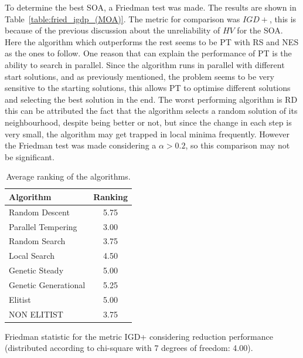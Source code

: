To determine the best SOA, a Friedman test was made. The results are shown in Table~\ref{table:fried_igdp_(MOA)}. The metric for comparison was $IGD+$, this is because of the previous discussion about the unreliability of $HV$ for the SOA. Here the algorithm which outperforms the rest seems to be PT with RS and NES as the ones to follow. One reason that can explain the performance of PT is the ability to search in parallel. Since the algorithm runs in parallel with different start solutions, and as previously mentioned, the problem seems to be very sensitive to the starting solutions, this allows PT to optimise different solutions and selecting the best solution in the end. The worst performing algorithm is RD this can be attributed the fact that the algorithm selects a random solution of its neighbourhood, despite being better or not, but since the change in each step is very small, the algorithm may get trapped in local minima frequently. However the Friedman test was made considering a $\alpha > 0.2$, so this comparison may not be significant.



\begin{table}[!htp]
    \centering
    \begin{threeparttable}
    \begin{tabular}{lc}
    \hline
    Algorithm&Ranking\\
    \hline
    Random Descent&5.75\\
    Parallel Tempering&3.00\\
    Random Search&3.75\\
    Local Search&4.50\\
    Genetic Steady&5.00\\
    Genetic Generational&5.25\\
    Elitist&5.00\\
    NON ELITIST&3.75\\
    \hline
    \end{tabular}
        \begin{tablenotes}
        \small
        \item Friedman statistic for the metric IGD+ considering reduction performance (distributed according to chi-square with 7 degrees of freedom: 4.00).
        \end{tablenotes}
    \end{threeparttable}
    \caption{Average ranking of the algorithms.}
    \label{table:fried_igdp_(SOA)}
\end{table}

